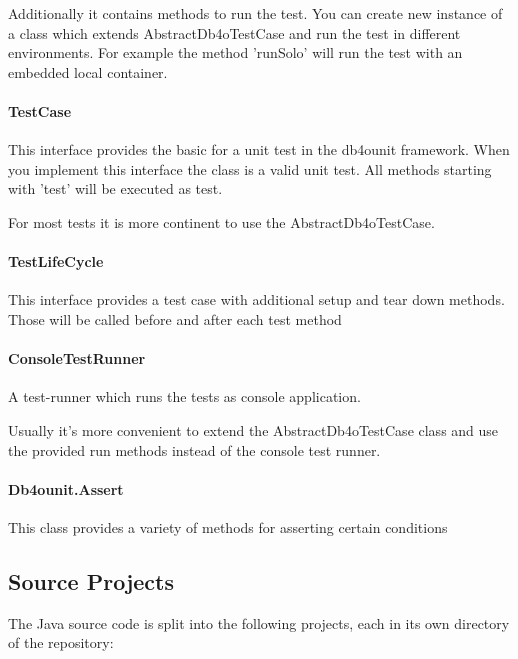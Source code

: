 Additionally it contains methods to run the test. You can create new instance of a class which extends AbstractDb4oTestCase and run the test in different environments. For example the method 'runSolo' will run the test with an embedded local container.

\paragraph*{TestCase}

This interface provides the basic for a unit test in the db4ounit framework. When you implement this interface the class is a valid unit test. All methods starting with 'test' will be executed as test.

For most tests it is more continent to use the AbstractDb4oTestCase.

\paragraph*{TestLifeCycle}

This interface provides a test case with additional setup and tear down methods. Those will be called before and after each test method

\paragraph*{ConsoleTestRunner}

A test-runner which runs the tests as console application.

Usually it's more convenient to extend the AbstractDb4oTestCase class and use the provided run methods instead of the console test runner.

\paragraph*{Db4ounit.Assert}

This class provides a variety of methods for asserting certain conditions

\subsection{Source Projects}
\label{ref:community-working-with-source-using-the-sources-from-db4o-distribution}

The Java source code is split into the following projects, each in its own directory of the repository:

